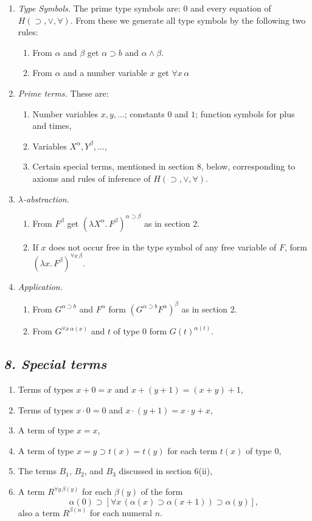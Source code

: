 \documentclass[12pt]{article}
\def\l{\lambda}
\def\limp{\supset}
\def\a{\alpha}
\def\b{\beta}
\def\HIMP{H(\limp, \lor, \forall)}
\begin{document}
\begin{enumerate}[label=(\roman*)]

\item {\it Type Symbols.} The prime type symbols are: $0$ and every equation of $\HIMP$. From these we generate all type symbols by the following two rules:
\begin{enumerate}
\item From $\a$ and $\b$ get $\a \limp b$ and $\a \land \b$.
\item From $\a$ and a number variable $x$ get $\forall x\, \a$
\end{enumerate}
\item {\it Prime terms.} These are:
\begin{enumerate}
\item Number variables $x, y, ...$; constants $0$ and $1$; function symbols for plus and times,
\item Variables $X^\a, Y^\b, ...$,
\item Certain special terms, mentioned in section 8, below, corresponding to axioms and rules of inference of $\HIMP$.
\end{enumerate}
\item {\it $\l$-abstraction.}
\begin{enumerate}
\item From $F^\b$ get $(\l X^\a .\, F^\b )^{\a \limp \b}$ as in section 2.
\item If $x$ does not occur free in the type symbol of any free variable of $F$, form $(\l x. \, F^\b)^{\forall x \, \b}$.
\end{enumerate}

\item {\it Application.}
\begin{enumerate}
\item From $G^{\a \limp b}$ and $F^\a$ form $(G^{\a \limp b} F^\a )^\b$ as in section 2.
\item From $G^{\forall x \, \a(x)}$ and $t$ of type $0$ form $G(t)^{\a(t)}$.
\end{enumerate}

\end{enumerate}

\subsection*{\it 8. Special terms}

\begin{enumerate}[label=(\roman*)]
\item Terms of types $x+0=x$ and $x+(y+1)=(x+y)+1$,
\item Terms of types $x \cdot 0=0$ and $x\cdot(y+1)=x \cdot y + x$,
\item A term of type $x = x$,
\item A term of type $x=y \limp t(x)=t(y)$ for each term $t(x)$ of type $0$,
\item The terms $B_1$, $B_2$, and $B_3$ discussed in section 6(ii),
\item A term $R^{\forall y \, \b(y)}$ for each $\b(y)$ of the form
$$
\a(0) \limp [\forall x \, (\a(x) \limp \a(x + 1)) \limp \a(y)],
$$
also a term $R^{\b(n)}$ for each numeral $n$.
\end{enumerate}
\end{document}
